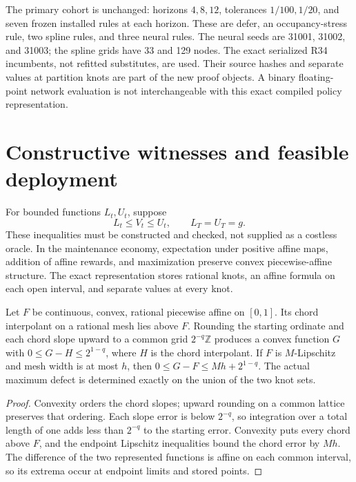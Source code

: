 The primary cohort is unchanged: horizons $4,8,12$, tolerances $1/100,1/20$, and seven frozen installed rules at each horizon. These are defer, an occupancy-stress rule, two spline rules, and three neural rules. The neural seeds are 31001, 31002, and 31003; the spline grids have 33 and 129 nodes. The exact serialized R34 incumbents, not refitted substitutes, are used. Their source hashes and separate values at partition knots are part of the new proof objects. A binary floating-point network evaluation is not interchangeable with this exact compiled policy representation.

\section{Constructive witnesses and feasible deployment}\label{sec:witness}
For bounded functions $L_t,U_t$, suppose
\begin{equation}\label{eq:witness}
 L_t\leq V_t\leq U_t,\qquad L_T=U_T=g.
\end{equation}
These inequalities must be constructed and checked, not supplied as a costless oracle. In the maintenance economy, expectation under positive affine maps, addition of affine rewards, and maximization preserve convex piecewise-affine structure. The exact representation stores rational knots, an affine formula on each open interval, and separate values at every knot.

\begin{lemma}\label{lem:encode}
Let $F$ be continuous, convex, rational piecewise affine on $[0,1]$. Its chord interpolant on a rational mesh lies above $F$. Rounding the starting ordinate and each chord slope upward to a common grid $2^{-q}\mathbb Z$ produces a convex function $G$ with $0\leq G-H\leq2^{1-q}$, where $H$ is the chord interpolant. If $F$ is $M$-Lipschitz and mesh width is at most $h$, then $0\leq G-F\leq Mh+2^{1-q}$. The actual maximum defect is determined exactly on the union of the two knot sets.
\end{lemma}
\begin{proof}
Convexity orders the chord slopes; upward rounding on a common lattice preserves that ordering. Each slope error is below $2^{-q}$, so integration over a total length of one adds less than $2^{-q}$ to the starting error. Convexity puts every chord above $F$, and the endpoint Lipschitz inequalities bound the chord error by $Mh$. The difference of the two represented functions is affine on each common interval, so its extrema occur at endpoint limits and stored points.\end{proof}

